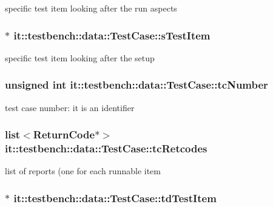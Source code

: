 specific test item looking after the run aspects \hypertarget{classit_1_1testbench_1_1data_1_1TestCase_ae1f04f1177b5a11841cedf052c270631}{
\subsubsection[{s\-Test\-Item}]{$\ast$ it\-::testbench\-::data\-::\-Test\-Case\-::s\-Test\-Item\hspace{0.3cm}{\ttfamily [private]}}}\label{de/d0a/classit_1_1testbench_1_1data_1_1TestCase_ae1f04f1177b5a11841cedf052c270631}
specific test item looking after the setup \hypertarget{classit_1_1testbench_1_1data_1_1TestCase_ab59292afb38506aa15b5b83c758805b5}{
\subsubsection[{tc\-Number}]{\setlength{\rightskip}{0pt plus 5cm}unsigned int it\-::testbench\-::data\-::\-Test\-Case\-::tc\-Number\hspace{0.3cm}{\ttfamily [private]}}}\label{de/d0a/classit_1_1testbench_1_1data_1_1TestCase_ab59292afb38506aa15b5b83c758805b5}
test case number\-: it is an identifier \hypertarget{classit_1_1testbench_1_1data_1_1TestCase_a4754cbcd70fd4d23a745a80af3caf28c}{
\subsubsection[{tc\-Retcodes}]{\setlength{\rightskip}{0pt plus 5cm}list$<${\bf Return\-Code}$\ast$$>$ it\-::testbench\-::data\-::\-Test\-Case\-::tc\-Retcodes\hspace{0.3cm}{\ttfamily [private]}}}\label{de/d0a/classit_1_1testbench_1_1data_1_1TestCase_a4754cbcd70fd4d23a745a80af3caf28c}
list of reports (one for each runnable item \hypertarget{classit_1_1testbench_1_1data_1_1TestCase_a58c8c8823ed6c7521d1c47d621ba01d8}{
\subsubsection[{td\-Test\-Item}]{$\ast$ it\-::testbench\-::data\-::\-Test\-Case\-::td\-Test\-Item\hspace{0.3cm}{\ttfamily [private]}}}\label{de/d0a/classit_1_1testbench_1_1data_1_1TestCase_a58c8c8823ed6c7521d1c47d621ba01d8}
